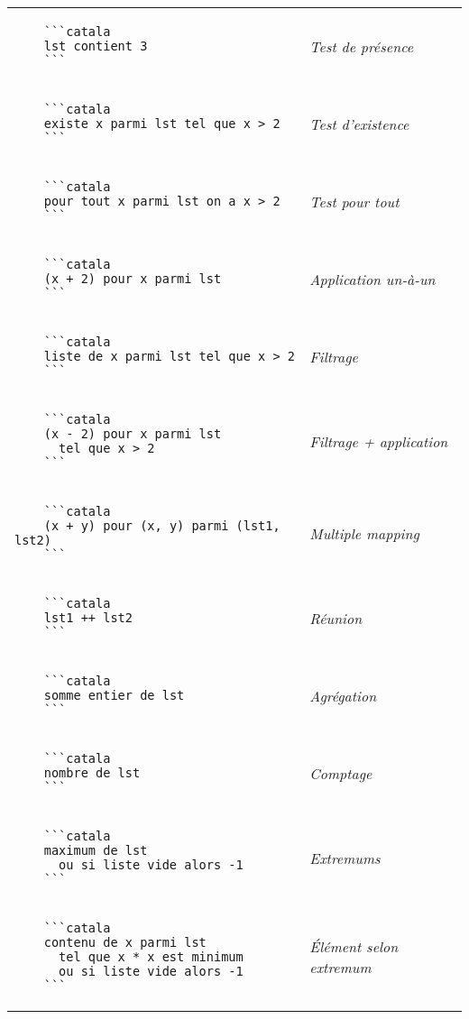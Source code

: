 \documentclass{article}
\makeatletter
\newenvironment{catala}{%
  \VerbatimEnvironment
  \let\FV@ListVSpace\relax
  \begin{verbatim}}%
 {\end{verbatim}}
\makeatother
\begin{document}
\begin{multicols}{3}
\begin{tabular}{@{}p{\cola}>{\slshape}p{\colb}@{}}
  \begin{catala}
    ```catala
    lst contient 3
    ```
  \end{catala}
  & Test de présence
  \\
  \begin{catala}
    ```catala
    existe x parmi lst tel que x > 2
    ```
  \end{catala}
  & Test d'existence
  \\
  \begin{catala}
    ```catala
    pour tout x parmi lst on a x > 2
    ```
  \end{catala}
  & Test pour tout
  \\
  \begin{catala}
    ```catala
    (x + 2) pour x parmi lst
    ```
  \end{catala}
  & Application un-à-un
  \\
  \begin{catala}
    ```catala
    liste de x parmi lst tel que x > 2
    ```
  \end{catala}
  & Filtrage
  \\
  \begin{catala}
    ```catala
    (x - 2) pour x parmi lst
      tel que x > 2
    ```
  \end{catala}
  & Filtrage + application
  \\
  \begin{catala}
    ```catala
    (x + y) pour (x, y) parmi (lst1, lst2)
    ```
  \end{catala}
  & Multiple mapping
  \\
  \begin{catala}
    ```catala
    lst1 ++ lst2
    ```
  \end{catala}
  & Réunion
  \\
  \begin{catala}
    ```catala
    somme entier de lst
    ```
  \end{catala}
  & Agrégation
  \\
  \begin{catala}
    ```catala
    nombre de lst
    ```
  \end{catala}
  & Comptage
  \\
  \begin{catala}
    ```catala
    maximum de lst
      ou si liste vide alors -1
    ```
  \end{catala}
  & Extremums
  \\
  \begin{catala}
    ```catala
    contenu de x parmi lst
      tel que x * x est minimum
      ou si liste vide alors -1
    ```
  \end{catala}
  & Élément selon extremum
  \\
\end{tabular}

\end{multicols}
\end{document}
